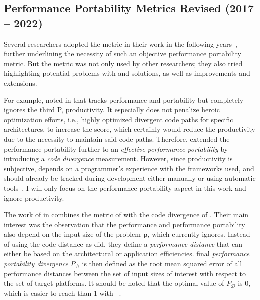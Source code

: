 \subsection{Performance Portability Metrics Revised (2017 -- 2022)}
\label{sec:pp_revised}

Several researchers adopted the \pp metric in their work in the following years~\cite{kirk_achieving_2017, hsu_performance_2018, pennycook_evaluating_2018, zhao_delivering_2018, yang_empirical_2018, yokota_beginners_2018, sedova_high-performance_2018, harrell_effective_2018, deakin_performance_2019, reguly_performance_2019, daniel_applying_2019, deakin_tracking_2020, bertoni_performance_2020, grete_k-athena_2021, deakin_analyzing_2021, ibrahim_performance_2022, dieguez_ml-based_2022, breyer_performance_2023, marowka_toward_2023, ernstsson_assessing_2023, rangel_performance-portable_2023, davis_taking_2024, crisci_minilb_2024, lorenzon_towards_2024, asahi_development_2024, guerrero_study_2025}, further underlining the necessity of such an objective performance portability metric. 
But the \pp metric was not only used by other researchers; they also tried highlighting potential problems with \pp and solutions, as well as improvements and extensions. 

For example, \citet{harrell_effective_2018} noted in \citeyear{harrell_effective_2018} that \pp tracks performance and portability but completely ignores the third P, productivity. 
It especially does not penalize heroic optimization efforts, i.e., highly optimized divergent code paths for specific architectures, to increase the \pp score, which certainly would reduce the productivity due to the necessity to maintain said code paths. 
Therefore, \citeauthor{harrell_effective_2018} extended the performance portability further to an \textit{effective performance portability} by introducing a \textit{code divergence} measurement. 
However, since productivity is subjective, depends on a programmer's experience with the frameworks used, and should already be tracked during development either manually or using automatic tools~\cite{harrell_effective_2018}, I will only focus on the performance portability aspect in this work and ignore productivity. 

The work of \citet{daniel_applying_2019} in \citeyear{daniel_applying_2019} combines the \pp metric of \citet{pennycook_evaluating_2018} with the code divergence of \citet{harrell_effective_2018}. 
Their main interest was the observation that the performance and performance portability also depend on the input size of the problem $\mathbf{p}$, which \pp currently ignores. 
Instead of using the code distance as \citeauthor{harrell_effective_2018} did, they define a \textit{performance distance} that can either be based on the architectural or application efficiencies. 
\citeauthor{daniel_applying_2019} final \textit{performance portability divergence} $P_\mathcal{D}$ is then defined as the root mean squared error of all performance distances between the set of input sizes of interest with respect to the set of target platforms. 
It should be noted that the optimal value of $P_\mathcal{D}$ is $0$, which is easier to reach than $1$ with \pp~\cite{daniel_applying_2019}. 

